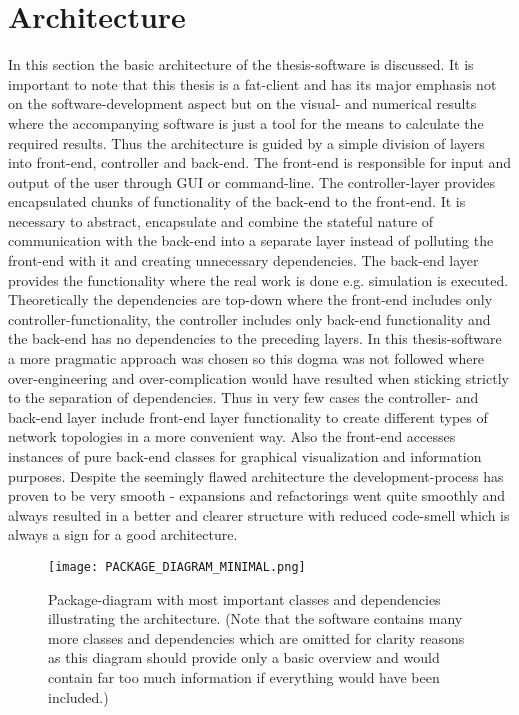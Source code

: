 \documentclass[Bachelorarbeit.tex]{subfiles}
\begin{document}
\section{Architecture}
In this section the basic architecture of the thesis-software is discussed. It is important to note that this thesis is a fat-client and has its major emphasis not on the software-development aspect but on the visual- and numerical results where the accompanying software is just a tool for the means to calculate the required results. Thus the architecture is guided by a simple division of layers into front-end, controller and back-end. The front-end is responsible for input and output of the user through GUI or command-line. The controller-layer provides encapsulated chunks of functionality of the back-end to the front-end. It is necessary to abstract, encapsulate and combine the stateful nature of communication with the back-end into a separate layer instead of polluting the front-end with it and creating unnecessary dependencies. The back-end layer provides the functionality where the real work is done e.g. simulation is executed.
\medskip
Theoretically the dependencies are top-down where the front-end includes only controller-functionality, the controller includes only back-end functionality and the back-end has no dependencies to the preceding layers. In this thesis-software a more pragmatic approach was chosen so this dogma was not followed where over-engineering and over-complication would have resulted when sticking strictly to the separation of dependencies. Thus in very few cases the controller- and back-end layer include front-end layer functionality to create different types of network topologies in a more convenient way. Also the front-end accesses instances of pure back-end classes for graphical visualization and information purposes. Despite the seemingly flawed architecture the development-process has proven to be very smooth - expansions and refactorings went quite smoothly and always resulted in a better and clearer structure with reduced code-smell which is always a sign for a good architecture.

\begin{figure}[H]
	\centering
  \texttt{[image: PACKAGE\_DIAGRAM\_MINIMAL.png]}
	\caption{Package-diagram with most important classes and dependencies illustrating the architecture. (Note that the software contains many more classes and dependencies which are omitted for clarity reasons as this diagram should provide only a basic overview and would contain far too much information if everything would have been included.)}
	\label{fig:PACKAGE_DIAGRAM_MINIMAL}
\end{figure}
\end{document}

